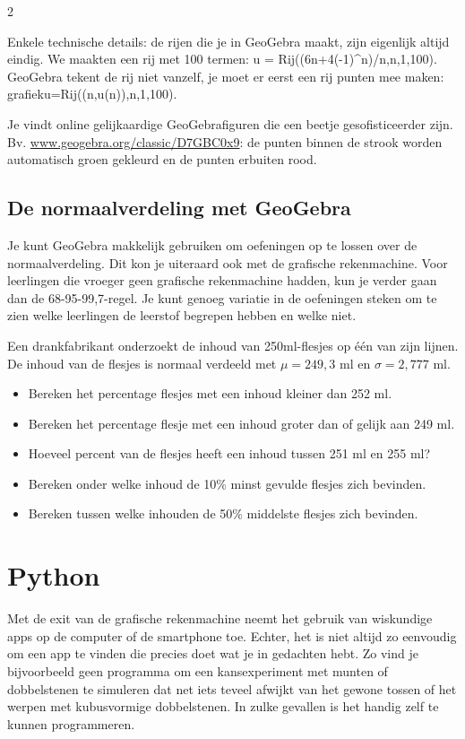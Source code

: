\begin{multicols}{2}

Enkele technische details: de rijen die je in \mbox{GeoGebra} maakt, zijn eigenlijk altijd eindig. We maakten een rij met 100 termen: u = \mbox{Rij((6n+4(-1)\^{}n)/n,n,1,100)}. GeoGebra tekent de rij niet vanzelf, je moet er eerst een rij punten mee maken:
grafieku=Rij((n,u(n)),n,1,100). 

Je vindt online gelijkaardige GeoGebrafiguren die een beetje gesofisticeerder zijn. Bv. \url{www.geogebra.org/classic/D7GBC0x9}: de punten binnen de strook worden automatisch groen gekleurd en de punten erbuiten rood. 


\subsection{De normaalverdeling met GeoGebra}
Je kunt GeoGebra makkelijk gebruiken om oefeningen op te lossen over de normaalverdeling. Dit kon je uiteraard ook met de grafische rekenmachine. Voor leerlingen die vroeger geen grafische rekenmachine hadden, kun je verder gaan dan de 68-95-99,7-regel. Je kunt genoeg variatie in de oefeningen steken om te zien welke leerlingen de leerstof begrepen hebben en welke niet.  

Een drankfabrikant onderzoekt de inhoud van 250ml-flesjes op één van zijn lijnen. De inhoud van de flesjes is normaal verdeeld met $\mu= 249,3$ ml en $\sigma = 2,777$ ml.
\begin{itemize}
\item Bereken het percentage flesjes met een inhoud kleiner dan 252 ml. 
\item Bereken het percentage flesje met een inhoud groter dan of gelijk aan 249 ml. 
\item Hoeveel percent van de flesjes heeft een inhoud tussen 251 ml en 255 ml?
\item  Bereken onder welke inhoud de 10\% minst gevulde flesjes zich bevinden.
\item Bereken tussen welke inhouden de 50\% middelste flesjes zich bevinden. 
\end{itemize}


	\section{Python}
Met de exit van de grafische rekenmachine neemt het gebruik van wiskundige apps op de computer of de smartphone toe. Echter, het is niet altijd zo eenvoudig om een app te vinden die precies doet wat je in gedachten hebt. Zo vind je bijvoorbeeld geen programma om een kansexperiment met munten of dobbelstenen te simuleren dat net iets teveel afwijkt van het gewone tossen of het werpen met kubusvormige dobbelstenen. In zulke gevallen is het handig zelf te kunnen programmeren. 
	

\end{multicols}
